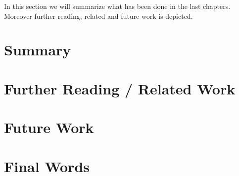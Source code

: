 
In this section we will summarize what has been done in the last chapters. Moreover further reading, related and future work is depicted.

\section{Summary}
\section{Further Reading / Related Work}
\section{Future Work}
\section{Final Words}